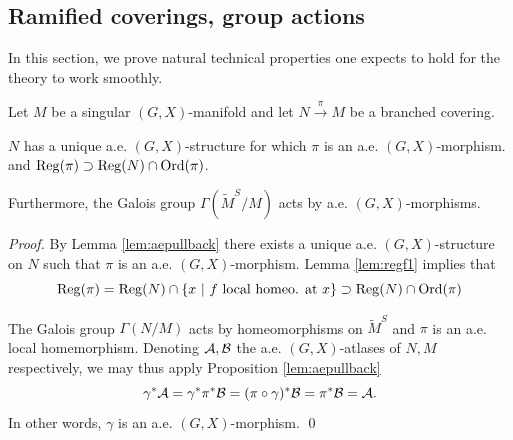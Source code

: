 % 
% 
%                   

\subsection{Ramified coverings, group actions}

In this section, we prove natural technical properties one expects to hold for the theory to work smoothly.




  \begin{prop} Let $M$ be a singular $(G,X)$-manifold and let $N\xrightarrow{\pi} M$ be a branched covering.
                    
                    $N$ has a unique a.e. $(G,X)$-structure for which $\pi$ is an a.e. $(G,X)$-morphism.
                    and $\mathrm{Reg}(\pi)\supset\mathrm{Reg}(N)\cap \mathrm{Ord}(\pi)$.
                    
                     Furthermore, the Galois group $\Gamma(\widetilde M^S/M)$ acts by a.e. $(G,X)$-morphisms.
                    \end{prop}
                    \begin{proof}
                        By Lemma \ref{lem:aepullback} there exists a unique a.e. $(G,X)$-structure on $N$ such that
                        $\pi$ is an a.e. $(G,X)$-morphism. Lemma \ref{lem:regf1} implies that $$\mathrm{Reg}(\pi)=\mathrm{Reg}(N)\cap\{x ~|~ f \text{ local homeo. at }x\}\supset \mathrm{Reg}(N)\cap \mathrm{Ord}(\pi)$$
                     
                     The Galois group $\Gamma(N/M)$ acts by homeomorphisms on $\widetilde M^S$ and $\pi$ is an a.e. local homemorphism. Denoting $\mathcal A,\mathcal B$ the a.e. $(G,X)$-atlases of $N,M$ respectively, we may thus apply Proposition \ref{lem:aepullback} 
                     $$\gamma^*\mathcal A = \gamma^* \pi^*\mathcal B=(\pi\circ \gamma)^*\mathcal B = \pi^*\mathcal B = \mathcal A.$$
                     In other words, $\gamma$ is an a.e. $(G,X)$-morphism. 
                    \qed\end{proof}

